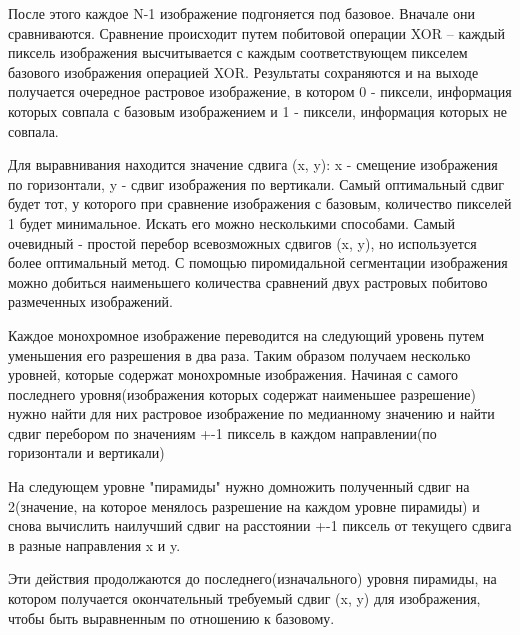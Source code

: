     После этого каждое N-1 изображение подгоняется под базовое. Вначале они сравниваются. Сравнение происходит путем побитовой операции XOR -- каждый пиксель изображения высчитывается с каждым соответствующем пикселем базового изображения операцией XOR. Результаты сохраняются и на выходе получается очередное растровое изображение, в котором 0 - пиксели, информация которых совпала с базовым изображением и 1 - пиксели, информация которых не совпала.

    Для выравнивания находится значение сдвига (x, y): x - смещение изображения по горизонтали, y - сдвиг изображения по вертикали.
Самый оптимальный сдвиг будет тот, у которого при сравнение изображения с базовым, количество пикселей 1 будет минимальное. Искать его можно несколькими способами. Самый очевидный - простой перебор всевозможных сдвигов (x, y), но используется более оптимальный метод. С помощью пиромидальной сегментации изображения можно добиться наименьшего количества сравнений двух растровых побитово размеченных изображений.

Каждое монохромное изображение переводится на следующий уровень путем уменьшения его разрешения в два раза. Таким образом получаем несколько уровней, которые содержат монохромные изображения. Начиная с самого последнего уровня(изображения которых содержат наименьшее разрешение) нужно найти для них растровое изображение по медианному значению и найти сдвиг перебором по значениям +-1 пиксель в каждом направлении(по горизонтали и вертикали)

На следующем уровне "пирамиды" нужно домножить полученный сдвиг на 2(значение, на которое менялось разрешение на каждом уровне пирамиды) и снова вычислить наилучший сдвиг на расстоянии +-1 пиксель от текущего сдвига в разные направления x и y.

Эти действия продолжаются до последнего(изначального) уровня пирамиды, на котором получается окончательный требуемый сдвиг (x, y) для изображения, чтобы быть выравненным по отношению к базовому.
